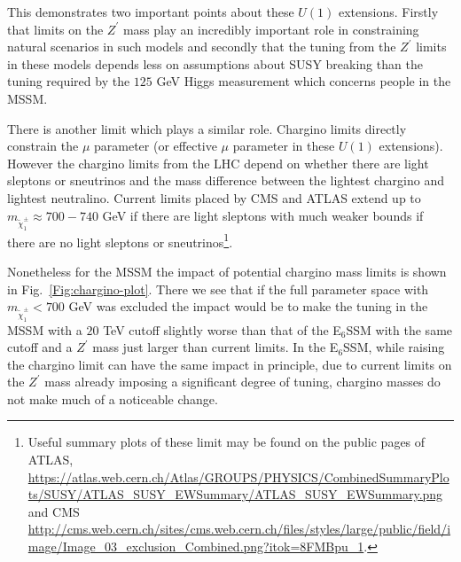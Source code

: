 \documentclass[preprint,amsmath,amssymb,aps,superscriptaddress,prd,showpacs,floatfix,nofootinbib]{revtex4-1}
\begin{document}
This demonstrates two important points about these $U(1)$
extensions. Firstly that limits on the $Z^\prime$ mass play an
incredibly important role in constraining natural scenarios in such
models and secondly that the tuning from the $Z^\prime$ limits in
these models depends less on assumptions about SUSY breaking than the
tuning required by the $125$ GeV Higgs measurement which concerns
people in the MSSM.

There is another limit which plays a similar role.  Chargino limits
directly constrain the $\mu$ parameter (or effective $\mu$ parameter
in these $U(1)$ extensions).  However the chargino limits from the LHC
depend on whether there are light sleptons or sneutrinos and the mass
difference between the lightest chargino and lightest neutralino.
Current limits placed by CMS and ATLAS extend up to
$m_{\tilde{\chi}^\pm_1} \approx 700-740$ GeV if there are light
sleptons\cite{Khachatryan:2014qwa, Aad:2014nua} with much weaker
bounds if there are no light sleptons or sneutrinos\footnote{Useful
  summary plots of these limit may be found on the public pages of
  ATLAS,
  \url{https://atlas.web.cern.ch/Atlas/GROUPS/PHYSICS/CombinedSummaryPlots/SUSY/ATLAS_SUSY_EWSummary/ATLAS_SUSY_EWSummary.png}
  and CMS
  \url{http://cms.web.cern.ch/sites/cms.web.cern.ch/files/styles/large/public/field/image/Image_03_exclusion_Combined.png?itok=8FMBpu_1}.}.




Nonetheless for the MSSM the impact of potential chargino mass limits is
shown in Fig.~\ref{Fig:chargino-plot}.  There we see that if the 
full parameter space with $m_{\tilde{\chi}^\pm_1} < 700$ GeV was excluded the
impact would be to make the tuning in the MSSM with a $20$ TeV cutoff
slightly worse than that of the E$_6$SSM with the same cutoff and a
$Z^\prime$ mass just larger than current limits. In the E$_6$SSM,
while raising the chargino limit can have the same impact in
principle, due to current limits on the $Z^\prime$ mass already
imposing a significant degree of tuning, chargino masses do not make
much of a noticeable change.
\end{document}
